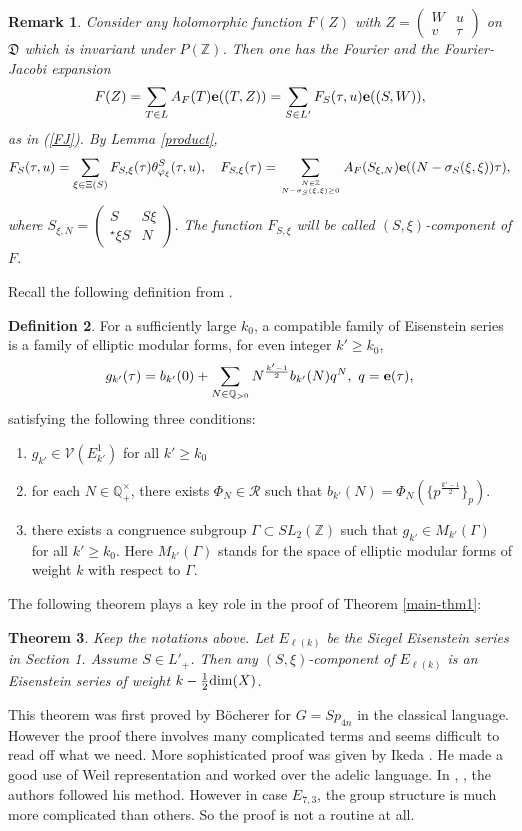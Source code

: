 \documentclass[11pt]{amsart}
\numberwithin{equation}{section}
\newtheorem{theorem}{Theorem}[section]
\newtheorem{remark}[theorem]{Remark}
\theoremstyle{definition}
\newtheorem{defin}[theorem]{Definition}
\begin{document}
\begin{remark}\label{important-rmk}
Consider any holomorphic function $F(Z)$ with $Z=\left(\begin{array}{cc}
W & u \\
v & \tau
\end{array}\right)$ on ${\mathfrak{D}}$ which is invariant under $P({\mathbb{Z}})$.
Then one has
the Fourier and the Fourier-Jacobi expansion
$$F(Z)=\sum_{T\in  L}A_F(T)\bold{e}((T,Z))=\sum_{S\in  L'}F_S(\tau,u)\bold{e}((S,W)),
$$
as in (\ref{FJ}).
By Lemma \ref{product},
$$F_S(\tau,u)=\sum_{\xi\in \Xi(S)}F_{S,\xi}(\tau) \theta^S_{\varphi_\xi}(\tau,u),\quad
F_{S,\xi}(\tau)=\sum_{N\in {\mathbb{Z}} \atop N-\sigma_S(\xi,\xi)\ge 0}A_F(S_{\xi,N})\bold{e}((N-\sigma_S(\xi,\xi))\tau),
$$
where $S_{\xi,N}=\left(\begin{array}{cc}
S & S\xi \\
{}^\star \xi S & N
\end{array}\right)$. The function $F_{S,\xi}$ will be called $(S,\xi)$-component of $F$.
\end{remark}

Recall the following definition from \cite{Ik1, Ik2} .
\begin{defin}\label{family} For a sufficiently large $k_0$, a compatible family of Eisenstein series is a family of elliptic modular forms, for even
integer $k'\geq k_0$,
$$g_{k'}(\tau)=b_{k'}(0)+\sum_{N\in{\mathbb{Q}}_{>0}} N^{\frac{k'-1}{2}} b_{k'}(N) q^N,\ q=\bold{e}(\tau),
$$
satisfying the following three conditions:
\begin{enumerate}
\item $g_{k'}\in\mathcal V(E^1_{k'})$ for all $k'\geq k_0$
\item for each $N\in{\mathbb{Q}}_+^\times$, there exists $\Phi_N\in\mathcal R$ such that $b_{k'}(N)=\Phi_N(\{p^{\frac{k'-1}{2}}\}_p)$.
\item there exists a congruence subgroup $\Gamma\subset SL_2({\mathbb{Z}})$ such that $g_{k'}\in M_{k'}(\Gamma)$ for all $k'\geq k_0$.
Here $ M_{k'}(\Gamma)$ stands for the space of elliptic modular forms of weight $k$ with respect to $\Gamma$.
\end{enumerate}
\end{defin}

The following theorem plays a key role  in the proof of Theorem \ref{main-thm1}:

\begin{theorem}\label{eisen}
Keep the notations above.
Let $E_{\ell(k)}$ be the Siegel Eisenstein series in Section 1. Assume $S\in L'_+$.
Then any $(S,\xi)$-component of $E_{\ell(k)}$ is an Eisenstein series of weight $k-\frac{1}{2}{\rm dim}(X)$.
\end{theorem}
This theorem was first proved by B\"ocherer \cite{bocherer} for $G=Sp_{4n}$ in the classical language.
However the proof there involves many complicated terms and seems difficult to read off what we need.
More sophisticated proof was given by Ikeda \cite{Ik3}. He made a good use of Weil representation and
worked over the adelic language. In \cite{Yamana}, \cite{KY}, the authors followed his method.
However in case $E_{7,3}$, the group structure is much more complicated than others. So the proof
is not a routine at all.
\end{document}
